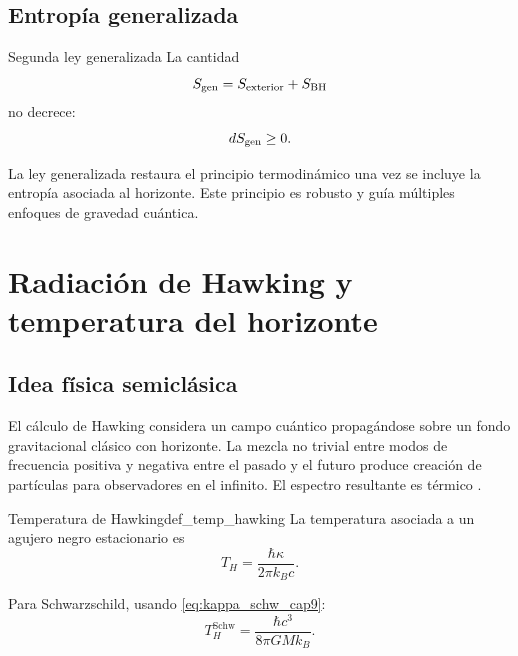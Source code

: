 \subsection{Entropía generalizada}

\begin{definicion}{Segunda ley generalizada}{}
La cantidad
\begin{equation}
  S_{\rm gen} = S_{\rm exterior} + S_{\rm BH}
\end{equation}
no decrece:
\begin{equation}
  dS_{\rm gen} \ge 0.
\end{equation}
\end{definicion}

La ley generalizada restaura el principio termodinámico una vez se incluye la entropía asociada al horizonte. Este principio es robusto y guía múltiples enfoques de gravedad cuántica.

\section{Radiación de Hawking y temperatura del horizonte}
\label{sec:radiacion_hawking}

\subsection{Idea física semiclásica}

El cálculo de Hawking considera un campo cuántico propagándose sobre un fondo gravitacional clásico con horizonte. La mezcla no trivial entre modos de frecuencia positiva y negativa entre el pasado y el futuro produce creación de partículas para observadores en el infinito. El espectro resultante es térmico \cite{Hawking1975}.

\begin{definicion}{Temperatura de Hawking}{def_temp_hawking}
La temperatura asociada a un agujero negro estacionario es
\begin{equation}
  \boxed{T_H = \frac{\hbar\kappa}{2\pi k_B c}.}
  \label{eq:TH_general}
\end{equation}
\end{definicion}

Para Schwarzschild, usando \eqref{eq:kappa_schw_cap9}:
\begin{equation}
  \boxed{T_H^{\text{Schw}} = \frac{\hbar c^3}{8\pi G M k_B}.}
  \label{eq:TH_schw}
\end{equation}

